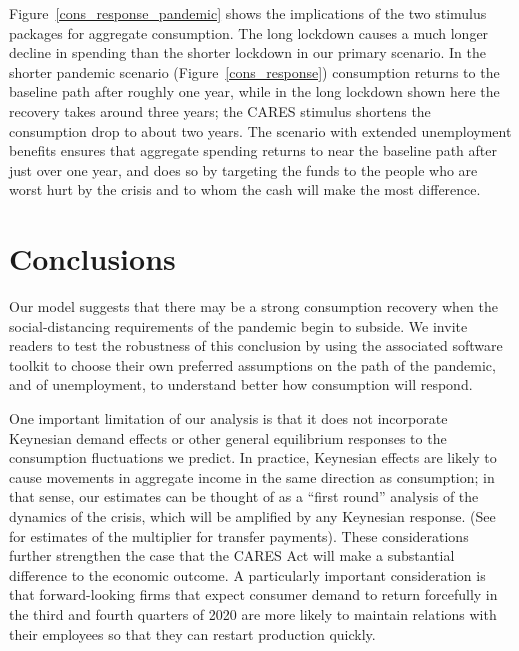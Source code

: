 \documentclass[titlepage,a4paper]{\econtex}
\begin{document}
Figure~\ref{cons_response_pandemic} shows the implications of the two stimulus packages for aggregate consumption.
The long lockdown causes a much longer decline in spending than the shorter lockdown in our primary scenario. In the shorter pandemic scenario (Figure~\ref{cons_response}) consumption returns to the baseline path after roughly one year, while in the long lockdown shown here the recovery takes around three years;
the CARES stimulus shortens the consumption drop to about two years.
The scenario with extended unemployment benefits ensures that aggregate spending returns to near the baseline path after just over one year, and does so by targeting the funds to the people who are worst hurt by the crisis and to whom the cash will make the most difference.

\section{Conclusions}

Our model suggests that there may be a strong consumption recovery when the social-distancing requirements of the pandemic begin to subside.
We invite readers to test the robustness of this conclusion by using the associated software toolkit to choose their own preferred assumptions on the path of the pandemic, and of unemployment, to understand better how consumption will respond.

One important limitation of our analysis is that it does not incorporate Keynesian demand effects or other general equilibrium responses to the consumption fluctuations we predict.
In practice, Keynesian effects are likely to cause movements in aggregate income in the same direction as consumption; in that sense, our estimates can be thought of as a ``first round'' analysis of the dynamics of the crisis, which will be amplified by any Keynesian response.  (See \cite{bayer_corona} for estimates of the multiplier for transfer payments).
These considerations further strengthen the case that the CARES Act will make a substantial difference to the economic outcome.
A particularly important consideration is that forward-looking firms that expect consumer demand to return forcefully in the third and fourth quarters of 2020 are more likely to maintain relations with their employees so that they can restart production quickly.
\end{document}
